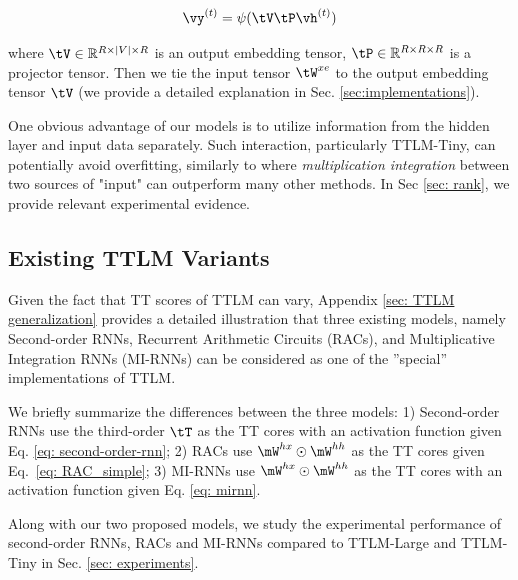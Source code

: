 \begin{equation}
\vy^{(t)} = \psi (\tV\tP\vh^{(t)})
\end{equation}

where $\tV\in\mathbb{R}^{R \times |V|\times R}$ is an output embedding tensor, $\tP\in\mathbb{R}^{R \times R\times R}$ is a projector tensor. Then we tie the input tensor $\tW^{xe}$ to the output embedding tensor $\tV$ (we provide a detailed explanation in Sec. \ref{sec:implementations}).

One obvious advantage of our models is to utilize information from the hidden layer and input data separately. Such interaction, particularly TTLM-Tiny, can potentially avoid overfitting, similarly to \cite{wu_multiplicative_2016} where \textit{multiplication integration} between two sources of "input" can outperform many other methods. In Sec \ref{sec: rank}, we provide relevant experimental evidence.



\subsection{Existing  TTLM Variants} 
\label{sec: Existing  TTLM variants}
Given the fact that TT scores of TTLM can vary,  Appendix \ref{sec: TTLM generalization} provides a detailed illustration that three existing models, namely Second-order RNNs,  Recurrent Arithmetic Circuits (RACs), and Multiplicative Integration RNNs (MI-RNNs)  can be considered as one of the ”special” implementations of TTLM. 

We briefly summarize the differences between the three models: 1) Second-order RNNs use the third-order $\tT$ as the TT cores with an activation function given Eq. \ref{eq: second-order-rnn}; 2)
RACs use $\mW^{hx} \odot \mW^{hh}$ as the TT cores given Eq.\ \ref{eq: RAC_simple};  3) MI-RNNs use $\mW^{hx} \odot \mW^{hh}$  as the TT cores with an activation function given Eq. \ref{eq: mirnn}. 

Along with our two proposed models, we study the experimental performance of second-order RNNs, RACs and MI-RNNs compared to TTLM-Large and TTLM-Tiny in Sec. \ref{sec: experiments}.




